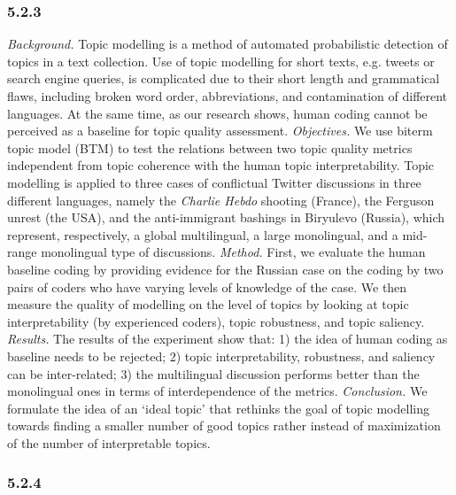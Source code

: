 \subsubsection{5.2.3}

\textit{Background.} Topic modelling is a method of automated probabilistic detection of topics in a text collection. Use of topic modelling for short texts, e.g. tweets or search engine queries, is complicated due to their short length and grammatical flaws, including broken word order, abbreviations, and contamination of different languages. At the same time, as our research shows, human coding cannot be perceived as a baseline for topic quality assessment. \textit{Objectives.} We use biterm topic model (BTM) to test the relations between two topic quality metrics independent from topic coherence with the human topic interpretability. Topic modelling is applied to three cases of conflictual Twitter discussions in three different languages, namely the \textit{Charlie Hebdo} shooting (France), the Ferguson unrest (the USA), and the anti-immigrant bashings in Biryulevo (Russia), which represent, respectively, a global multilingual, a large monolingual, and a mid-range monolingual type of discussions. \textit{Method.} First, we evaluate the human baseline coding by providing evidence for the Russian case on the coding by two pairs of coders who have varying levels of knowledge of the case. We then measure the quality of modelling on the level of topics by looking at topic interpretability (by experienced coders), topic robustness, and topic saliency. \textit{Results.} The results of the experiment show that: 1) the idea of human coding as baseline needs to be rejected; 2) topic interpretability, robustness, and saliency can be inter-related; 3) the multilingual discussion performs better than the monolingual ones in terms of interdependence of the metrics. \textit{Conclusion.} We formulate the idea of an ‘ideal topic’ that rethinks the goal of topic modelling towards finding a smaller number of good topics rather instead of maximization of the number of interpretable topics.

\subsubsection{5.2.4}

